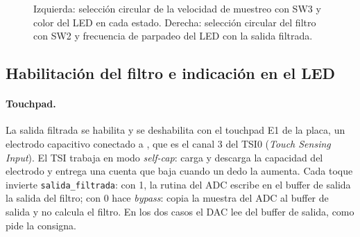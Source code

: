 \documentclass[11pt,a4paper]{article}
\begin{document}
\begin{figure}[H]
\centering
{}
\caption{Izquierda: selección circular de la velocidad de muestreo con SW3 y
color del LED en cada estado. Derecha: selección circular del filtro con SW2
y frecuencia de parpadeo del LED con la salida filtrada.}
\label{fig:estados}
\end{figure}

\subsection{Habilitación del filtro e indicación en el LED}\label{sec:habilitacion}

\paragraph{Touchpad.} La salida filtrada se habilita y se deshabilita con el
touchpad E1 de la placa, un electrodo capacitivo conectado a ,
que es el canal 3 del TSI0 (\emph{Touch Sensing Input}). El TSI trabaja en
modo \emph{self-cap}: carga y descarga la capacidad del electrodo y entrega
una cuenta que baja cuando un dedo la aumenta. Cada toque invierte
\texttt{salida\_filtrada}: con 1, la rutina del ADC escribe en el buffer de
salida la salida del filtro; con 0 hace \emph{bypass}: copia la muestra del
ADC al buffer de salida y no calcula el filtro. En los dos casos el DAC lee
del buffer de salida, como pide la consigna.
\end{document}
